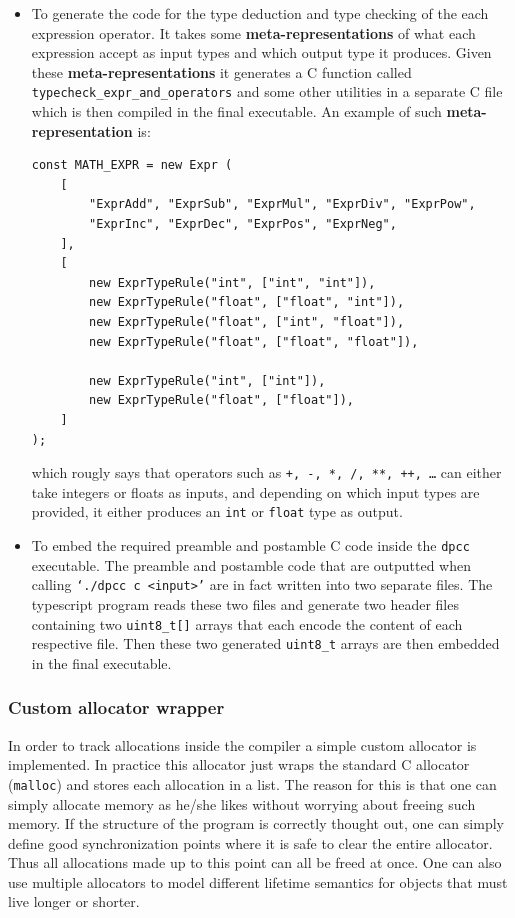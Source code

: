 \documentclass[a4paper]{article}
\begin{document}
\begin{itemize}
    \item To generate the code for the type deduction and type checking of the each expression operator. It takes
        some \textbf{meta-representations} of what each expression accept as input types and which output type it produces.
        Given these \textbf{meta-representations} it generates a C function called \texttt{typecheck\_expr\_and\_operators} and some other utilities in a separate C file which is then compiled in the final executable.
        An example of such \textbf{meta-representation} is:
        \begin{lstlisting}[language=JS]
const MATH_EXPR = new Expr (
    [
        "ExprAdd", "ExprSub", "ExprMul", "ExprDiv", "ExprPow",
        "ExprInc", "ExprDec", "ExprPos", "ExprNeg",
    ],
    [
        new ExprTypeRule("int", ["int", "int"]),
        new ExprTypeRule("float", ["float", "int"]),
        new ExprTypeRule("float", ["int", "float"]),
        new ExprTypeRule("float", ["float", "float"]),

        new ExprTypeRule("int", ["int"]),
        new ExprTypeRule("float", ["float"]),
    ]
);
        \end{lstlisting}

    which rougly says that operators such as \texttt{+, -, *, /, **, ++, \dots} can either take integers or floats as inputs,
    and depending on which input types are provided, it either produces an \texttt{int} or \texttt{float} type as output.

    \item To embed the required preamble and postamble C code inside the \texttt{dpcc} executable. The preamble and
        postamble code that are outputted when calling \texttt{`./dpcc c <input>'} are in fact written
        into two separate files. The typescript program reads these two files and generate two header files
        containing two \texttt{uint8\_t[]} arrays that each encode the content of each respective file. Then
        these two generated \texttt{uint8\_t} arrays are then embedded in the final executable.
\end{itemize}


\subsubsection{Custom allocator wrapper}

In order to track allocations inside the compiler a simple custom allocator is implemented.
In practice this allocator just wraps the standard C allocator (\texttt{malloc}) and stores each allocation
in a list. The reason for this is that one can simply allocate memory as he/she likes without worrying about freeing
such memory. If the structure of the program is correctly thought out, one can simply define good synchronization
points where it is safe to clear the entire allocator. Thus all allocations made up to this point
can all be freed at once. One can also use multiple allocators to model different lifetime semantics for objects
that must live longer or shorter.
\end{document}
